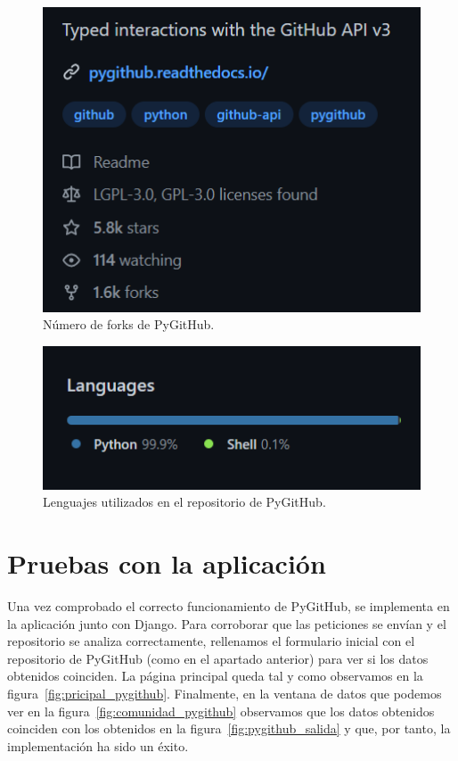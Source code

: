 \documentclass[a4paper, 12pt]{book}
\begin{document}
\begin{figure}
    \centering
    \includegraphics[width=1\textwidth, keepaspectratio]{img/pygithub_forks.png}
    \caption{Número de forks de PyGitHub.}\label{fig:pygithub_forks}
\end{figure}
\begin{figure}
    \centering
    \includegraphics[width=1\textwidth, keepaspectratio]{img/pygithub_lenguajes.png}
    \caption{Lenguajes utilizados en el repositorio de PyGitHub.}\label{fig:pygithub_lenguajes}
\end{figure}
\section{Pruebas con la aplicación}
Una vez comprobado el correcto funcionamiento de PyGitHub, se implementa en la aplicación junto con Django. Para corroborar que las peticiones se envían y el repositorio se analiza correctamente, rellenamos el formulario inicial con el repositorio de PyGitHub (como en el apartado anterior) para ver si los datos obtenidos coinciden. La página principal queda tal y como observamos en la figura~\ref{fig:pricipal_pygithub}. Finalmente, en la ventana de datos que podemos ver en la figura~\ref{fig:comunidad_pygithub} observamos que los datos obtenidos coinciden con los obtenidos en la figura~\ref{fig:pygithub_salida} y que, por tanto, la implementación ha sido un éxito.
\end{document}
